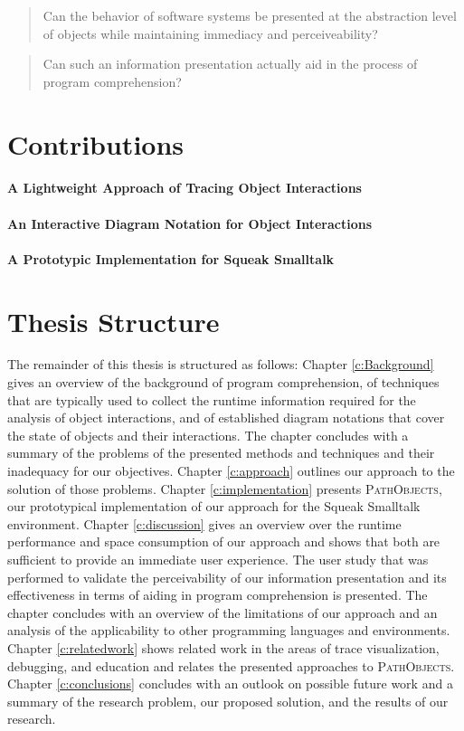 \begin{quote}
Can the behavior of software systems be presented at the abstraction level of objects while maintaining immediacy and perceiveability?
\end{quote}
\begin{quote}
Can such an information presentation actually aid in the process of program comprehension?
\end{quote}


\section{Contributions}
\label{s:contributions}

\paragraph{A Lightweight Approach of Tracing Object Interactions}
\paragraph{An Interactive Diagram Notation for Object Interactions}
\paragraph{A Prototypic Implementation for Squeak Smalltalk}

\section{Thesis Structure}
The remainder of this thesis is structured as follows:
Chapter \ref{c:Background} gives an overview of the background of program comprehension, of techniques that are typically used to collect the runtime information required for the analysis of object interactions, and of established diagram notations that cover the state of objects and their interactions.
The chapter concludes with a summary of the problems of the presented methods and techniques and their inadequacy for our objectives.
Chapter \ref{c:approach} outlines our approach to the solution of those problems.
Chapter \ref{c:implementation} presents \textsc{PathObjects}, our prototypical implementation of our approach for the Squeak Smalltalk environment.
Chapter \ref{c:discussion} gives an overview over the runtime performance and space consumption of our approach and shows that both are sufficient to provide an immediate user experience.
The user study that was performed to validate the perceivability of our information presentation and its effectiveness in terms of aiding in program comprehension is presented.
The chapter concludes with an overview of the limitations of our approach and an analysis of the applicability to other programming languages and environments.
Chapter \ref{c:relatedwork} shows related work in the areas of trace visualization, debugging, and education and relates the presented approaches to \textsc{PathObjects}.
Chapter \ref{c:conclusions} concludes with an outlook on possible future work and a summary of the research problem, our proposed solution, and the results of our research.